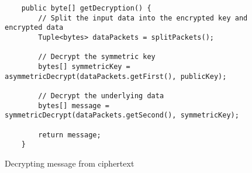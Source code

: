 \begin{figure}[H]
  \centering
  \begin{verbatim}
	public byte[] getDecryption() {
		// Split the input data into the encrypted key and encrypted data
		Tuple<bytes> dataPackets = splitPackets();

		// Decrypt the symmetric key
		bytes[] symmetricKey = asymmetricDecrypt(dataPackets.getFirst(), publicKey);
        
		// Decrypt the underlying data
		bytes[] message = symmetricDecrypt(dataPackets.getSecond(), symmetricKey);
        
		return message;
	}
  \end{verbatim}
  \caption{Decrypting message from ciphertext}
  \label{code:decrypt_data}
\end{figure}
